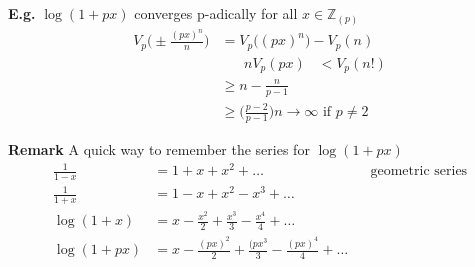 \documentclass[11pt]{article}
\begin{document}
\textbf{E.g.} $\log (1+px)$ converges p-adically for all $x \in \mathbb{Z}_{(p)}$
\begin{align*}
	V_p\Bigg(\pm \frac{(px)^n}{n} \Bigg) &= V_p\Big((px)^n\Big) - V_p(n)\\
	& \hspace{20pt} nV_p(px) \hspace{10pt}<V_p(n!)\\
	&\geq n - \frac{n}{p-1}\\
	&\geq \Bigg(\frac{p-2}{p-1}\Bigg)n \rightarrow \infty \text{ if } p \neq 2 
\end{align*}

\textbf{Remark}
A quick way to remember the series for $\log(1+px)$
\begin{align*}
	\frac{1}{1-x} &= 1 + x+x^2 + \dots && \text{geometric series}\\
	\frac{1}{1+x} & = 1-x+x^2 -x^3 + \dots\\[0.5em]
	\log(1+x) &= x-\frac{x^2}{2} + \frac{x^3}{3} -\frac{x^4}{4} + \dots \\[0.5em]
	\log(1+px) &= x-\frac{(px)^2}{2} + \frac{(px^3}{3} -\frac{(px)^4}{4} + \dots \\[0.5em]
\end{align*}
\end{document}
